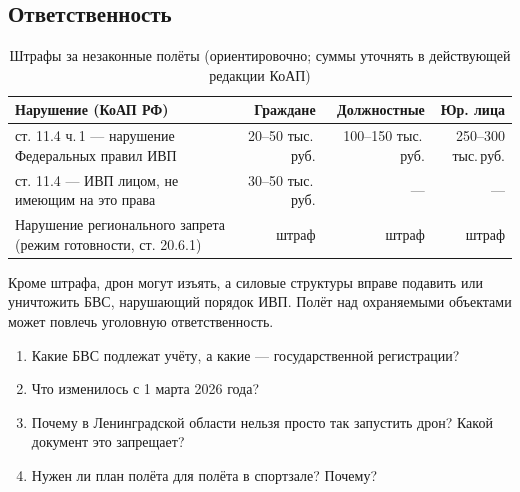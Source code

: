 \subsection{Ответственность}
\begin{table}[H]\centering\small
\renewcommand{\arraystretch}{1.25}
\begin{tabularx}{\linewidth}{@{}X r r r@{}}
\toprule
\textbf{Нарушение (КоАП РФ)} & \textbf{Граждане} & \textbf{Должностные} & \textbf{Юр. лица} \\
\midrule
ст. 11.4 ч.\,1 — нарушение Федеральных правил ИВП & \numrange{20}{50} тыс.\,руб. & \numrange{100}{150} тыс.\,руб. & \numrange{250}{300} тыс.\,руб. \\
ст. 11.4 — ИВП лицом, не имеющим на это права & \numrange{30}{50} тыс.\,руб. & — & — \\
Нарушение регионального запрета (режим готовности, ст. 20.6.1) & штраф & штраф & штраф \\
\bottomrule
\end{tabularx}
\caption{Штрафы за незаконные полёты (ориентировочно; суммы уточнять в действующей редакции КоАП)}
\end{table}
Кроме штрафа, дрон могут изъять, а силовые структуры вправе подавить или уничтожить БВС, нарушающий порядок ИВП. Полёт над охраняемыми объектами может повлечь уголовную ответственность.

\begin{exam}
\begin{enumerate}
\item Какие БВС подлежат учёту, а какие — государственной регистрации?
\item Что изменилось с 1 марта 2026 года?
\item Почему в Ленинградской области нельзя просто так запустить дрон? Какой документ это запрещает?
\item Нужен ли план полёта для полёта в спортзале? Почему?
\end{enumerate}
\end{exam}
